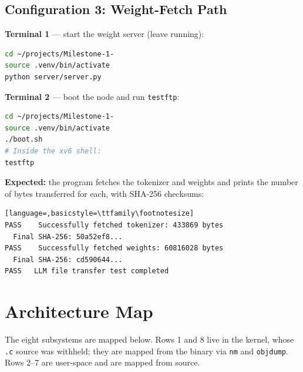 \documentclass[11pt,a4paper]{article}
\begin{document}
\subsection{Configuration 3: Weight-Fetch Path}

\textbf{Terminal 1} --- start the weight server (leave running):
\begin{lstlisting}[language=bash]
cd ~/projects/Milestone-1-
source .venv/bin/activate
python server/server.py
\end{lstlisting}

\textbf{Terminal 2} --- boot the node and run \texttt{testftp}:
\begin{lstlisting}[language=bash]
cd ~/projects/Milestone-1-
source .venv/bin/activate
./boot.sh
# Inside the xv6 shell:
testftp
\end{lstlisting}

\textbf{Expected:} the program fetches the tokenizer and weights and prints the number of bytes transferred for each, with SHA-256 checksums:
\begin{lstlisting}[language=,basicstyle=\ttfamily\footnotesize]
PASS    Successfully fetched tokenizer: 433869 bytes
  Final SHA-256: 50a52ef8...
PASS    Successfully fetched weights: 60816028 bytes
  Final SHA-256: cd590644...
PASS   LLM file transfer test completed
\end{lstlisting}

\section{Architecture Map}

The eight subsystems are mapped below. Rows 1 and 8 live in the kernel, whose \texttt{.c} source was withheld; they are mapped from the binary via \texttt{nm} and \texttt{objdump}. Rows 2--7 are user-space and are mapped from source.
\end{document}

